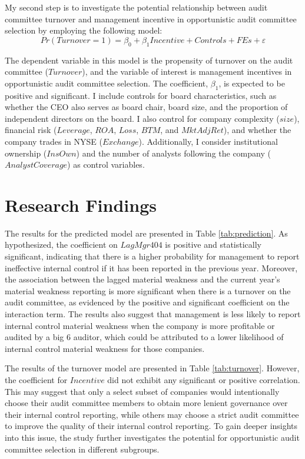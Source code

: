 \documentclass[12pt,english]{article}
\begin{document}
My second step is to investigate the potential relationship between audit committee turnover and management incentive in opportunistic audit committee selection by employing the following model:
\setlength{\abovedisplayskip}{0pt}
\begin{equation*}
Pr(Turnover = 1) =\beta_{0} + \beta_{1}Incentive + Controls + FEs + \varepsilon
\end{equation*}

The dependent variable in this model is the propensity of turnover on the audit committee ($Turnover$), and the variable of interest is management incentives in opportunistic audit committee selection. The coefficient, $\beta_{1}$, is expected to be positive and significant. I include controls for board characteristics, such as whether the CEO also serves as board chair, board size, and the proportion of independent directors on the board. I also control for company complexity ($size$), financial risk ($Leverage$, $ROA$, $Loss$, $BTM$, and $Mkt Adj Ret$), and whether the company trades in NYSE ($Exchange$). Additionally, I consider institutional ownership ($Ins Own$) and the number of analysts following the company ($Analyst Coverage$) as control variables.

\section{Research Findings}\label{sec:results}
The results for the predicted model are presented in Table \ref{tab:prediction}. As hypothesized, the coefficient on $Lag Mgr 404$ is positive and statistically significant, indicating that there is a higher probability for management to report ineffective internal control if it has been reported in the previous year. Moreover, the association between the lagged material weakness and the current year's material weakness reporting is more significant when there is a turnover on the audit committee, as evidenced by the positive and significant coefficient on the interaction term. The results also suggest that management is less likely to report internal control material weakness when the company is more profitable or audited by a big 6 auditor, which could be attributed to a lower likelihood of internal control material weakness for those companies.

The results of the turnover model are presented in Table \ref{tab:turnover}. However, the coefficient for $Incentive$ did not exhibit any significant or positive correlation. This may suggest that only a select subset of companies would intentionally choose their audit committee members to obtain more lenient governance over their internal control reporting, while others may choose a strict audit committee to improve the quality of their internal control reporting. To gain deeper insights into this issue, the study further investigates the potential for opportunistic audit committee selection in different subgroups.
\end{document}
